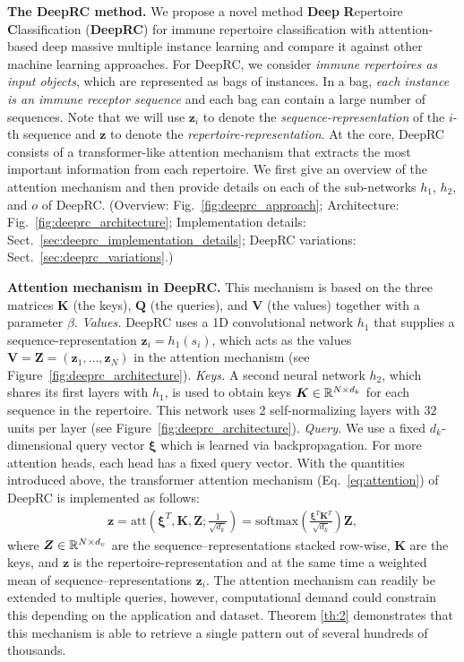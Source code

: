 \documentclass[oneside]{book}
\newcommand\Bz{\bm{z}}
\newcommand\BK{\bm{K}}
\newcommand\BQ{\bm{Q}}
\newcommand\BV{\bm{V}}
\newcommand\BZ{\bm{Z}}
\newcommand\Bxi{\bm{\xi}}
\newcommand\att{\mathrm{att}}
\newcommand{\soft}{\mathrm{softmax}}
\begin{document}
%
\textbf{The DeepRC method.} We propose a novel 
method \textbf{Deep} \textbf{R}epertoire \textbf{C}lassification 
(\textbf{DeepRC}) for immune 
repertoire classification with attention-based deep massive 
multiple instance learning and compare it against 
other machine learning approaches. 
For DeepRC, we consider \emph{immune repertoires as input objects},
which are represented as bags of instances. In a bag, \emph{each instance is
an immune receptor sequence} and each bag can contain a large number of sequences. 
Note that we will use $\Bz_i$ to denote the \emph{sequence-representation} of 
the $i$-th sequence and $\Bz$ to denote the \emph{repertoire-representation}. 
At the core, DeepRC consists of a transformer-like 
attention mechanism that
extracts the most important information from each repertoire.
We first give an overview of the attention mechanism and then 
provide details on each of the sub-networks 
$h_1$, $h_2$, and $o$ of DeepRC.
(Overview: Fig.~\ref{fig:deeprc_approach}; 
Architecture: Fig.~\ref{fig:deeprc_architecture}; 
Implementation details: Sect.~\ref{sec:deeprc_implementation_details};
DeepRC variations: Sect.~\ref{sec:deeprc_variations}.)

\textbf{Attention mechanism in DeepRC.}
%
This mechanism is based on the three
matrices $\BK$ (the keys), $\BQ$ (the queries), and $\BV$
(the values) together with a parameter
$\beta$.
%
\textit{Values.} 
DeepRC uses a 1D convolutional network $h_1$ \citep{lecun1998gradient,hu2014convolutional,kelley2016basset}
that supplies a sequence-representation $\Bz_i=h_1(s_i)$,
which acts as the values $\BV=\BZ= (\Bz_1, \ldots, \Bz_{N})$ 
in the attention mechanism (see Figure~\ref{fig:deeprc_architecture}). 
%
\textit{Keys.}
A second neural network $h_2$,
which shares its first layers with $h_1$,
is used to obtain keys 
$\BK \in \dR^{N \times d_k}$ for each 
sequence in the repertoire.
This network uses 2 self-normalizing layers \citep{klambauer2017self} 
with $32$ units per layer (see Figure~\ref{fig:deeprc_architecture}).
%
\textit{Query.} 
We use a fixed $d_k$-dimensional query vector $\Bxi$ which 
is learned via backpropagation.
For more attention heads, each head has a fixed query vector.
With the quantities introduced above, 
the transformer attention mechanism (Eq.~\eqref{eq:attention}) 
of DeepRC is implemented 
as follows:
%
\begin{align}
    \Bz= \att(\Bxi^T,\BK,\BZ; \frac{1}{\sqrt{d_k}}) = \soft\left(\frac{\Bxi^T \BK^T}{\sqrt{d_k}}\right) \BZ,
\end{align}
%
where $\BZ \in \dR^{N \times d_v}$ are the sequence--representations
stacked row-wise, $\BK$ are the keys, and
$\Bz$ is the repertoire-representation
and at the same time a weighted mean of sequence--representations $\Bz_i$. 
The attention mechanism can readily be extended to multiple queries, however,
computational demand could constrain this depending
on the application and dataset. Theorem
\ref{th:2} demonstrates that this mechanism is able to retrieve a single 
pattern out of several hundreds of thousands.
\end{document}
